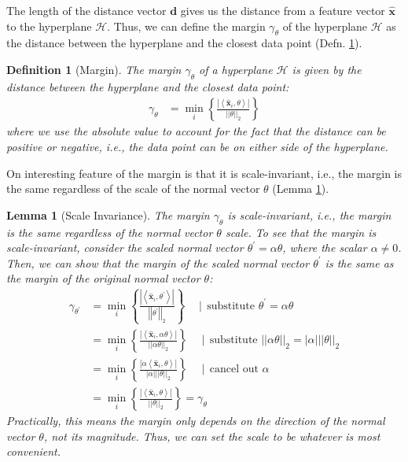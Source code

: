 \documentclass{article}[11pt]
\newtheorem{lemma}{Lemma}
\newtheorem{defn}{Definition}
\newcommand{\norm}[1]{\left|\left|#1\right|\right|}
\begin{document}
The length of the distance vector $\mathbf{d}$ gives us the distance from a feature vector $\hat{\mathbf{x}}$ to the hyperplane $\mathcal{H}$.
Thus, we can define the margin $\gamma_{\theta}$ of the hyperplane $\mathcal{H}$ as the distance between the hyperplane and the closest data point (Defn. \ref{defn:margin}).
\begin{defn}[Margin]\label{defn:margin}
    The margin $\gamma_{\theta}$ of a hyperplane $\mathcal{H}$ is given by the distance between the hyperplane and the closest data point:
    \begin{align*}
        \gamma_{\theta} & = \min_{i}\left\{\frac{|\left<\hat{\mathbf{x}}_{i},\theta\right>|}{\norm{\theta}_{2}}\right\}
    \end{align*}
where we use the absolute value to account for the fact that the distance can be positive or negative, i.e., the data point can be on either side of the hyperplane.
\end{defn}

On interesting feature of the margin is that it is scale-invariant, i.e., the margin is the same regardless of the scale of the normal vector $\theta$
(Lemma \ref{lem:scale-invariance}).
\begin{lemma}[Scale Invariance]\label{lem:scale-invariance}
    The margin $\gamma_{\theta}$ is scale-invariant, i.e., the margin is the same regardless of the normal vector $\theta$ scale.
    To see that the margin is scale-invariant, consider the scaled normal vector $\theta^{\prime} = \alpha\theta$, where the scalar $\alpha\neq{0}$.
    Then, we can show that the margin of the scaled normal vector $\theta^{\prime}$ is the same as the margin of the original normal vector $\theta$:
    \begin{align*}
        \gamma_{\theta^{\prime}} & = \min_{i}\left\{\frac{|\left<\hat{\mathbf{x}}_{i},\theta^{\prime}\right>|}{\norm{\theta^{\prime}}_{2}}\right\}\quad\mid\,\text{substitute $\theta^{\prime} = \alpha\theta$} \\
        & = \min_{i}\left\{\frac{|\left<\hat{\mathbf{x}}_{i},\alpha\theta\right>|}{\norm{\alpha\theta}_{2}}\right\}\quad\mid\,\text{substitute $\norm{\alpha\theta}_{2} = |\alpha|\norm{\theta}_{2}$} \\
        & = \min_{i}\left\{\frac{|\alpha\left<\hat{\mathbf{x}}_{i},\theta\right>|}{|\alpha|\norm{\theta}_{2}}\right\}\quad\mid\,\text{cancel out $\alpha$} \\
        & = \min_{i}\left\{\frac{|\left<\hat{\mathbf{x}}_{i},\theta\right>|}{\norm{\theta}_{2}}\right\} = \gamma_{\theta}
    \end{align*}
    Practically, this means the margin only depends on the direction of the normal vector $\theta$, not its magnitude.
    Thus, we can set the scale to be whatever is most convenient.
\end{lemma}
\end{document}
